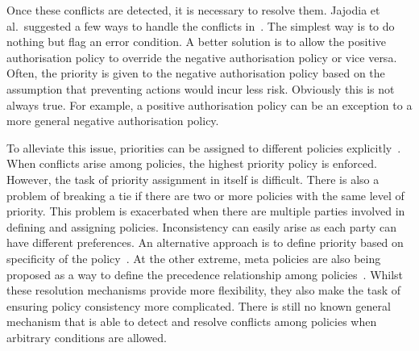 Once these conflicts are detected, it is necessary to resolve
them. Jajodia et al.\ suggested a few ways to handle the conflicts
in~\cite{SJ97}. The simplest way is to do nothing but flag an error
condition. A better solution is to allow the positive authorisation
policy to override the negative authorisation policy or vice
versa. Often, the priority is given to the negative authorisation
policy based on the assumption that preventing actions would incur
less risk. Obviously this is not always true. For example, a positive
authorisation policy can be an exception to a more general negative
authorisation policy.

To alleviate this issue, priorities can be assigned to different
policies explicitly~\cite{EL99}. When conflicts arise among policies,
the highest priority policy is enforced. However, the task of priority
assignment in itself is difficult. There is also a problem of breaking
a tie if there are two or more policies with the same level of
priority. This problem is exacerbated when there are multiple parties
involved in defining and assigning policies. Inconsistency can easily
arise as each party can have different preferences. An alternative
approach is to define priority based on specificity of the
policy~\cite{AH90}. At the other extreme, meta policies are also being
proposed as a way to define the precedence relationship among
policies~\cite{EL99}. Whilst these resolution mechanisms provide more
flexibility, they also make the task of ensuring policy consistency
more complicated.  There is still no known general mechanism that is
able to detect and resolve conflicts among policies when arbitrary
conditions are allowed.



